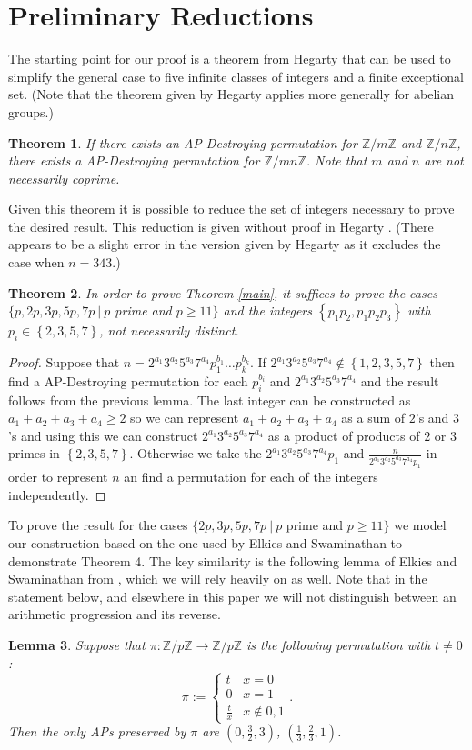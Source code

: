 \documentclass[12pt]{amsart}
\newtheorem{thm}{Theorem}
\newtheorem{lemma}[thm]{Lemma}
\theoremstyle{definition}
\theoremstyle{remark}
\newcommand{\Z}{\mathbb Z}
\begin{document}
\section{Preliminary Reductions}
The starting point for our proof is a theorem from Hegarty \cite{hegarty2004permutations} that can be used to simplify the general case to five infinite classes of integers and a finite exceptional set. (Note that the theorem given by Hegarty \cite{hegarty2004permutations} applies more generally for abelian groups.)
\begin{thm}\label{Product}
If there exists an AP-Destroying permutation for $\Z/m\Z$ and $\Z/n\Z$, there exists a AP-Destroying permutation for $\Z/mn\Z$. Note that $m$ and $n$ are not necessarily coprime.
\end{thm}
Given this theorem it is possible to reduce the set of integers necessary to prove the desired result. This reduction is given without proof in Hegarty \cite{hegarty2004permutations}. (There appears to be a slight error in the version given by Hegarty \cite{hegarty2004permutations} as it excludes the case when $n=343$.)
\begin{thm}
In order to prove Theorem \ref{main}, it suffices to prove the cases $\{p, 2p, 3p, 5p, 7p~|~p$ prime and $p\ge 11\}$ and the integers $\left\{p_1p_2,p_1p_2p_3\right\}$ with $p_i\in\left\{2,3,5,7\right\}$, not necessarily distinct.
\end{thm}
\begin{proof}
Suppose that $n=2^{a_1}3^{a_2}5^{a_3}7^{a_4}p_1^{b_1}\ldots p_k^{b_k}$. If $2^{a_1}3^{a_2}5^{a_3}7^{a_4}\not\in\left\{1, 2,3,5,7\right\}$ then find a AP-Destroying permutation for each $p_i^{b_i}$ and $2^{a_1}3^{a_2}5^{a_3}7^{a_4}$ and the result follows from the previous lemma. The last integer can be constructed as $a_1+a_2+a_3+a_4\ge 2$ so we can represent $a_1+a_2+a_3+a_4$ as a sum of $2$'s and $3$'s and using this we can construct $2^{a_1}3^{a_2}5^{a_3}7^{a_4}$ as a product of products of $2$ or $3$ primes in $\left\{2,3,5,7\right\}$. Otherwise we take the $2^{a_1}3^{a_2}5^{a_3}7^{a_4}p_1$ and $\frac{n}{2^{a_1}3^{a_2}5^{a_3}7^{a_4}p_1}$ in order to represent $n$ an find a permutation for each of the integers independently. 
\end{proof}
To prove the result for the cases $\{2p, 3p, 5p, 7p~|~p$ prime and $p\ge 11\}$ we model our construction based on the one used by Elkies and Swaminathan \cite{Ashvin} to demonstrate Theorem 4. The key similarity is the following lemma of Elkies and Swaminathan from \cite{Ashvin}, which we will rely heavily on as well. Note that in the statement below, and elsewhere in this paper we will not distinguish between an arithmetic progression and its reverse.
\begin{lemma}\label{hi}
Suppose that $\pi: \Z/p\Z\to \Z/p\Z$ is the following permutation with $t\neq 0$:
\[\pi:=\begin{cases}
t & x=0
\\ 0 & x=1
\\ \frac{t}{x} & x\notin{0, 1}
\end{cases}.\]
Then the only APs preserved by $\pi$ are $(0, \frac{3}{2}, 3)$, $(\frac{1}{3}, \frac{2}{3}, 1)$. 
\end{lemma}
\end{document}
